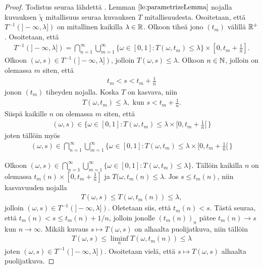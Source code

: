 \documentclass[12pt,oneside,a4paper]{amsbook} %
\begin{document}
\begin{proof}
    Todistus seuraa lähdettä \cite[s. 40]{optimal}. Lemman $\ref{le:parametrizeLemma}$ nojalla kuvauksen $\tilde \chi$ mitallisuus seuraa kuvauksen $T$ mitallisuudesta. Osoitetaan, että $T^{-1}(]-\infty, \lambda])$ on mitallinen kaikilla $\lambda \in \mathbb{R}$. Olkoon tiheä jono $(t_m)$ välillä ${\mathbb{R}^{+}}$. Osoitetaan, että
    \begin{align*}
        T^{-1}(]-\infty, \lambda]) = \bigcap_{n=1}^\infty \bigcup_{m=1}^\infty \{\omega \in [0, 1] : T(\omega, t_m) \le \lambda\} \times [0, t_m + \frac{1}{n}].
    \end{align*}
    Olkoon $(\omega, s) \in T^{-1}(]-\infty, \lambda])$, jolloin $T(\omega, s) \le \lambda$. Olkoon $n \in \mathbb{N}$, jolloin on olemassa $m$ siten, että 
    \begin{align*}
        t_m < s < t_m + \frac{1}{n}
    \end{align*}
    jonon $(t_m)$ tiheyden nojalla. Koska $T$ on kasvava, niin
    \begin{align*}
        T(\omega, t_m) \le \lambda, \text{ kun } s < t_m + \frac{1}{n}.
    \end{align*}
    Siispä kaikille $n$ on olemassa $m$ siten, että
    \begin{align*}
        (\omega, s) \in \{\omega \in [0, 1] : T(\omega, t_m) \le \lambda \times [0, t_m + \frac{1}{n}[ \, \}
    \end{align*}
    joten tällöin myös
    \begin{align*}
        (\omega, s) \in \bigcap_{n=1}^\infty \bigcup_{m=1}^\infty\{\omega \in [0, 1] : T(\omega, t_m) \le \lambda \times [0, t_m + \frac{1}{n}[ \, \}
    \end{align*}

    Olkoon $(\omega, s) \in \bigcap_{n=1}^\infty \bigcup_{m=1}^\infty \{\omega \in [0, 1] : T(\omega, t_m) \le \lambda\}.$ Tällöin kaikilla $n$ on olemassa $t_m(n) \times [0, t_m + \frac{1}{n}]$ ja $T(\omega, t_m(n) \le \lambda$. Jos $s \le t_m(n)$, niin kasvavuuden nojalla 
    \begin{align*}
        T(\omega, s) \le T(\omega, t_m(n)) \le \lambda,
    \end{align*}
    jolloin $(\omega, s) \in T^{-1}(]-\infty, \lambda])$. Oletetaan siis, että $t_m(n) < s$. Tästä seuraa, että $t_m(n) < s \le t_m(n) + 1/n$, jolloin jonolle $(t_m(n))_n$ pätee $t_m(n) \to s$ kun $n \to \infty$. Mikäli kuvaus $s \mapsto T(\omega, s)$ on alhaalta puolijatkuva, niin tällöin
    \begin{align*}
        T(\omega, s) \le \liminf_n T(\omega, t_m(n)) \le \lambda
    \end{align*}
    joten $(\omega, s) \in T^{-1}(]-\infty, \lambda])$. Osoitetaan vielä, että $s \mapsto T(\omega, s)$ alhaalta puolijatkuva.
    

\end{proof}
\end{document}
